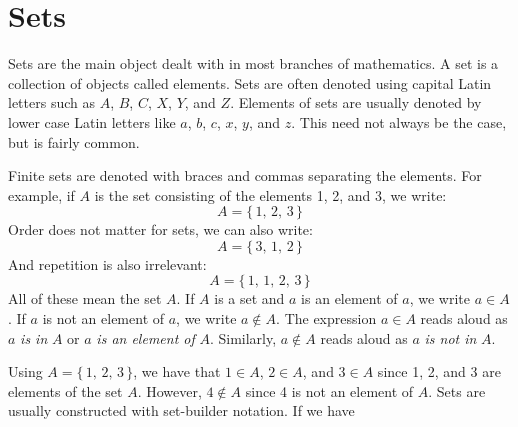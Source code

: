 \documentclass{article}
\theoremstyle{plain}
\theoremstyle{normal}
\newenvironment{example}{%
    \pushQED{\qed}\renewcommand{\qedsymbol}{$\blacksquare$}\examplex%
}{%
    \popQED\endexamplex%
}
\newenvironment{definition}{%
    \pushQED{\qed}\renewcommand{\qedsymbol}{$\blacksquare$}\definitionx%
}{%
    \popQED\enddefinitionx%
}
\newenvironment{notation}{%
    \pushQED{\qed}\renewcommand{\qedsymbol}{$\blacksquare$}\notationx%
}{%
    \popQED\endnotationx%
}
\begin{document}
    \section{Sets}
        Sets are the main object dealt with in most branches of mathematics.
        \begin{definition}[\textbf{Set}]
            A set is a collection of objects called elements.
        \end{definition}
        Sets are often denoted using capital Latin letters such as
        $A$, $B$, $C$, $X$, $Y$, and $Z$. Elements of sets are usually denoted
        by lower case Latin letters like $a$, $b$, $c$, $x$, $y$, and $z$. This
        need not always be the case, but is fairly common.
        \begin{example}
            Finite sets are denoted with braces and commas separating the
            elements. For example, if $A$ is the set consisting of the elements
            1, 2, and 3, we write:
            \begin{equation}
                A=\{\,1,\,2,\,3\,\}
            \end{equation}
            Order does not matter for sets, we can also write:
            \begin{equation}
                A=\{\,3,\,1,\,2\,\}
            \end{equation}
            And repetition is also irrelevant:
            \begin{equation}
                A=\{\,1,\,1,\,2,\,3\,\}
            \end{equation}
            All of these mean the set $A$.
        \end{example}
        \begin{notation}[\textbf{Containment}]
            If $A$ is a set and $a$ is an element of $a$, we write
            $a\in{A}$. If $a$ is not an element of $a$, we write
            $a\notin{A}$.
        \end{notation}
        The expression $a\in{A}$ reads aloud as
        $a$ \textit{is in} $A$ or $a$ \textit{is an element of} $A$. Similarly,
        $a\notin{A}$ reads aloud as $a$ \textit{is not in} $A$.
        \begin{example}
            Using $A=\{\,1,\,2,\,3\,\}$, we have that
            $1\in{A}$, $2\in{A}$, and $3\in{A}$ since 1, 2, and 3 are elements
            of the set $A$. However, $4\notin{A}$ since 4 is not an element of
            $A$.
        \end{example}
        Sets are usually constructed with set-builder notation. If we have
\end{document}
